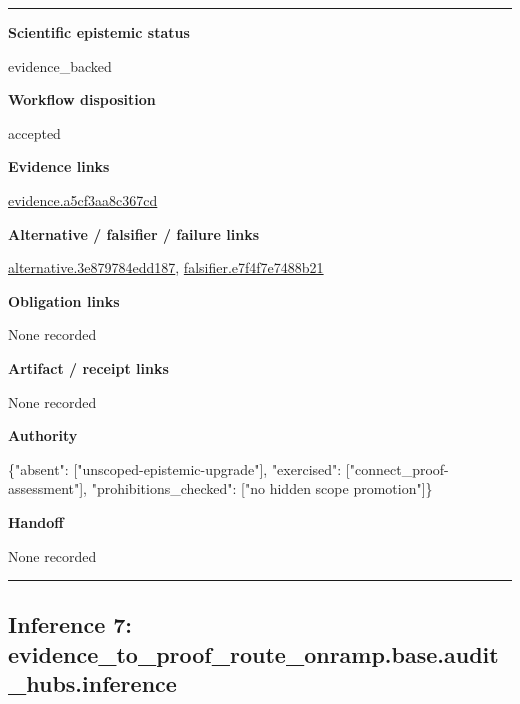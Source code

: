 \documentclass[10pt,a4paper]{article}
\newcommand{\TraceField}[2]{\par\noindent\textbf{#1}\par\noindent #2\par\smallskip}
\newenvironment{TraceDossier}{\par\medskip\noindent\hrule\medskip}{\medskip\hrule\par\medskip}
\begin{document}
\begin{TraceDossier}
\TraceField{Scientific epistemic status}{evidence\_\allowbreak{}backed}

\TraceField{Workflow disposition}{accepted}

\TraceField{Evidence links}{\hyperlink{trace-evidence-0c874a12bcdd8a4434}{evidence.\allowbreak{}a5cf3aa8c3\allowbreak{}67cd}}

\TraceField{Alternative / falsifier / failure links}{\hyperlink{trace-alternative-b71e68ca5074894c9d}{alternativ\allowbreak{}e.\allowbreak{}3e879784ed\allowbreak{}d187}, \hyperlink{trace-alternative-f9b73e60a25ce75929}{falsifier.\allowbreak{}e7f4f7e748\allowbreak{}8b21}}

\TraceField{Obligation links}{None recorded}

\TraceField{Artifact / receipt links}{None recorded}

\TraceField{Authority}{\{"absent":\allowbreak{} ["unscoped\allowbreak{}-\allowbreak{}epistemic-\allowbreak{}upgrade"],\allowbreak{} "exercised\allowbreak{}":\allowbreak{} ["connect\_\allowbreak{}proof-\allowbreak{}assessment\allowbreak{}"], "prohibiti\allowbreak{}ons\_\allowbreak{}checked":\allowbreak{} ["no hidden scope promotion"\allowbreak{}]\}}

\TraceField{Handoff}{None recorded}

\end{TraceDossier}
\pagebreak[2]\subsection{Inference 7: evidence\_\allowbreak{}to\_\allowbreak{}proof\_\allowbreak{}route\_\allowbreak{}onramp.\allowbreak{}base.\allowbreak{}audit\_\allowbreak{}hubs.\allowbreak{}inference}\label{trace-inference-d3f84b55c758128272}
\end{document}
